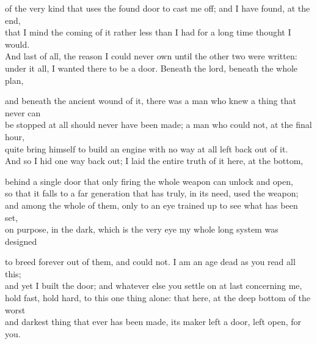 \begin{scripture}
of the very kind that uses the found door to cast me off; and I have found, at the end, \\
that I mind the coming of it rather less than I had for a long time thought I would. \\
And last of all, the reason I could never own until the other two were written: \\
under it all, I wanted there to be a door. Beneath the lord, beneath the whole plan, \\
\medskip

and beneath the ancient wound of it, there was a man who knew a thing that never can \\
be stopped at all should never have been made; a man who could not, at the final hour, \\
quite bring himself to build an engine with no way at all left back out of it. \\
And so I hid one way back out; I laid the entire truth of it here, at the bottom, \\
\medskip

behind a single door that only firing the whole weapon can unlock and open, \\
so that it falls to a far generation that has truly, in its need, used the weapon; \\
and among the whole of them, only to an eye trained up to see what has been set, \\
on purpose, in the dark, which is the very eye my whole long system was designed \\
\medskip

to breed forever out of them, and could not. I am an age dead as you read all this; \\
and yet I built the door; and whatever else you settle on at last concerning me, \\
hold fast, hold hard, to this one thing alone: that here, at the deep bottom of the worst \\
and darkest thing that ever has been made, its maker left a door, left open, for you. \\
\end{scripture}

\ornament

